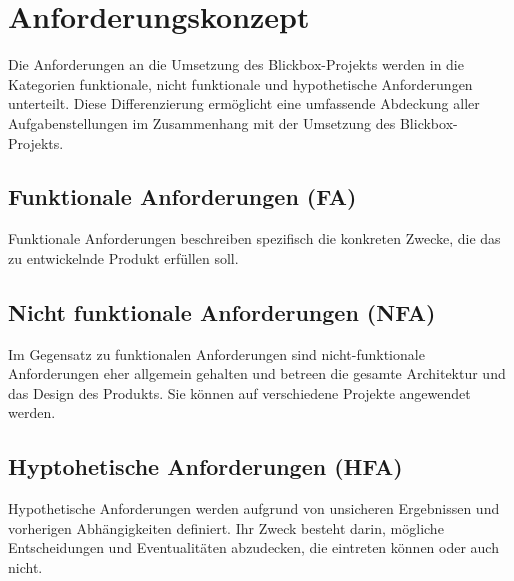 \documentclass[
]{article}
\begin{document}
\section{Anforderungskonzept}
Die Anforderungen an die Umsetzung des Blickbox-Projekts werden in die Kategorien funktionale, nicht funktionale und hypothetische Anforderungen unterteilt.
Diese Differenzierung ermöglicht eine umfassende Abdeckung aller Aufgabenstellungen im
Zusammenhang mit der Umsetzung des Blickbox-Projekts.

\subsection{Funktionale Anforderungen (FA)}
  Funktionale Anforderungen beschreiben spezifisch die konkreten Zwecke, die das zu entwickelnde Produkt erfüllen soll.

\subsection{Nicht funktionale Anforderungen (NFA)}
Im Gegensatz zu funktionalen Anforderungen sind nicht-funktionale Anforderungen eher allgemein gehalten und betreen die gesamte Architektur und das Design des Produkts.
Sie können auf verschiedene Projekte angewendet werden.

\subsection{Hyptohetische Anforderungen (HFA)}
Hypothetische Anforderungen werden aufgrund von unsicheren Ergebnissen und vorherigen Abhängigkeiten definiert. Ihr Zweck besteht darin, mögliche Entscheidungen und Eventualitäten abzudecken, die eintreten können oder auch nicht.
\end{document}
